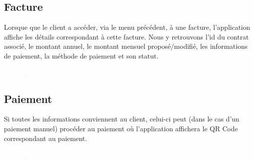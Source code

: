 \subsection{Facture}
\begin{flushleft}
Lorsque que le client a accéder, via le menu précédent, à une facture, l'application affiche les détails correspondant à cette facture. Nous y retrouvons l'id du contrat associé, le montant annuel, le montant mensuel proposé/modifié, les informations de paiement, la méthode de paiement et son statut.
\end{flushleft}
\begin{figure}[h]
\centering
\includegraphics[width = 1]{extension-maxime/interface/img/facture.png}
\end{figure}

\subsection{Paiement}
\begin{flushleft}
Si toutes les informations conviennent au client, celui-ci peut (dans le cas d'un paiement manuel) procéder au paiement où l'application affichera le QR Code correspondant au paiement.
\end{flushleft}
\begin{figure}[h]
\centering
\includegraphics[width = 1]{extension-maxime/interface/img/paiement.png}
\end{figure}

